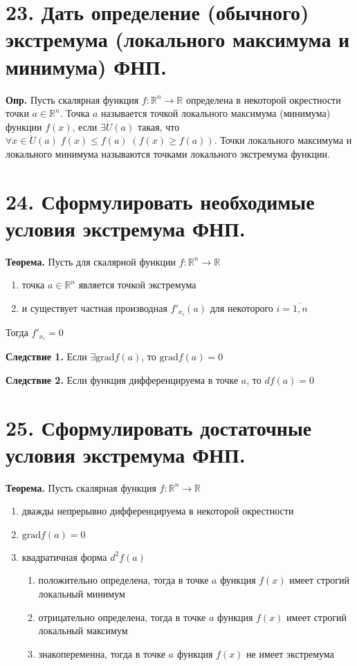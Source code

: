 \documentclass[11pt]{article}
\begin{document}
\section*{23. Дать определение (обычного) экстремума (локального максимума и минимума) ФНП.}
\par\textbf{Опр.} Пусть скалярная функция $f: \mathbb{R}^{n} \to \mathbb{R}$ определена в некоторой окрестности точки $a \in \mathbb{R}^n$. Точка $a$ называется точкой локального максимума (минимума) функции $f(x)$, если $\exists \mathring{U}(a)$ такая, что $\forall x \in \mathring{U}(a) \; f(x) \leq f(a) \; (f(x) \geq f(a))$. Точки локального максимума и локального минимума называются точками локального экстремума функции.
\section*{24. Сформулировать необходимые условия экстремума ФНП.}
\par\textbf{Теорема.} Пусть для скалярной функции $f: \mathbb{R}^{n} \to \mathbb{R}$
\begin{enumerate}
    \item точка $a \in \mathbb{R}^n$ является точкой экстремума
    \item и существует частная производная $f'_{x_{i}}(a)$ для некоторого $i = \overline{1, n}$
\end{enumerate}
\par Тогда $f'_{x_{i}} = 0$
\par\textbf{Следствие 1.} Если $\exists \text{grad} f(a)$, то $\text{grad} f(a) = 0$
\par\textbf{Следствие 2.} Если функция дифференцируема в точке $a$, то $df(a) = 0$
\section*{25. Сформулировать достаточные условия экстремума ФНП.}
\par\textbf{Теорема.} Пусть скалярная функция $f: \mathbb{R}^{n} \to \mathbb{R}$
\begin{enumerate}
    \item дважды непрерывно дифференцируема в некоторой окрестности
    \item $\text{grad} f(a) = 0$
    \item квадратичная форма $d^2f(a)$ 
    \begin{enumerate}
        \item положительно определена, тогда в точке $a$ функция $f(x)$ имеет строгий локальный минимум
        \item отрицательно определена, тогда в точке $a$ функция $f(x)$ имеет строгий локальный максимум
        \item знакопеременна, тогда в точке $a$ функция $f(x)$ не имеет экстремума
    \end{enumerate}
\end{enumerate}
\end{document}
